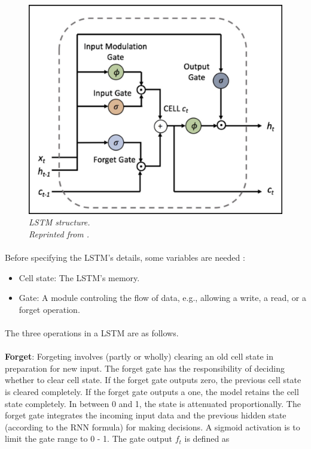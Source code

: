 \begin{figure}[H]
  \centering
  \caption[LSTM structure.]{\emph{LSTM structure. \\ Reprinted from  \citeauthor{sirinart_tangruamsub_2017} \citeyear{sirinart_tangruamsub_2017}.}}\label{fig:LSTM}
  \includegraphics[scale = 0.3]{figures/LSTM.jpg}  
\end{figure}

\paragraph{}
Before specifying the LSTM's details, some variables are needed \cite{sirinart_tangruamsub_2017}:
\begin{itemize}
\item Cell state: The LSTM's memory.
\item Gate: A module controling the flow of data, e.g., allowing a write, a read, or a forget operation.
\end{itemize}
\paragraph{}
The three operations in a LSTM are as follows.

\paragraph{}
\textbf{Forget}: Forgeting involves (partly or wholly) clearing an old cell state in preparation for new input. The forget gate has the responsibility of deciding whether to clear cell state. If the forget gate outputs zero, the previous cell state is cleared completely. If the forget gate outputs a one, the model retains the cell state completely. In between 0 and 1, the state is attenuated proportionally. The forget gate integrates the incoming input data and the previous hidden state (according to the RNN formula) for making decisions. A sigmoid activation is to limit the gate range to 0 - 1. The gate output $f_t$ is defined as

